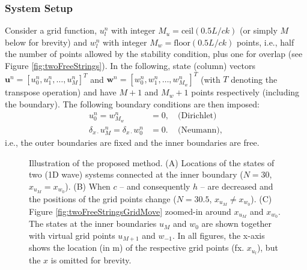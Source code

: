 \documentclass[dvipsnames, reprint]{JASA}
\begin{document}
\subsubsection{System Setup}\label{sec:systSetup}
Consider a grid function, $u_l^n$ with integer $M_u = \text{ceil}(0.5L/ck)$ (or simply $M$ below for brevity) and $w_l^n$ with integer $M_w = \text{floor}(0.5L/ck)$ points, i.e., half the number of points allowed by the stability condition, plus one for overlap (see Figure \ref{fig:twoFreeStrings}). In the following, state (column) vectors $\mathbf{u}^n = [u_0^n, u_1^n, \hdots, u_M^n]^T$ and $\mathbf{w}^n = [w_0^n, w_1^n, \hdots, w_{M_w}^n]^T$ (with $T$ denoting the transpose operation) and have $M + 1$ and $M_{w} + 1$ points respectively (including the boundary). The following boundary conditions are then imposed:
\begin{subequations}\label{eq:halfStringBoundaryCond}
    \begin{align}
        u_0^n = w_{M_w}^n &= 0,\quad \text{(Dirichlet)}\label{eq:halfStringBoundaryCondDirichlet}\\
        \delta_{x\cdot}u_M^n = \delta_{x\cdot}w_0^n &= 0.\, \quad\text{(Neumann)}, \label{eq:halfStringBoundaryCondNeumann}
    \end{align}
\end{subequations}
i.e., the outer boundaries are fixed and the inner boundaries are free.
%
\begin{figure}[ht]
\caption{Illustration of the proposed method. (A) Locations of the states of two (1D wave) systems connected at the inner boundary ($N = 30$, $x_{u_M} = x_{w_0}$). (B) When $c$ -- and consequently $h$ -- are decreased and the positions of the grid points change ($N = 30.5$, $x_{u_M} \neq x_{w_0}$). (C) Figure \ref{fig:twoFreeStringsGridMove} zoomed-in around $x_{u_M}$ and $x_{w_0}$. The states at the inner boundaries $u_M$ and $w_0$ are shown together with virtual grid points $u_{M+1}$ and $w_{-1}$. In all figures, the x-axis shows the location (in m) of the respective grid points (fx. $x_{u_l}$), but the $x$ is omitted for brevity.}
\end{figure}
\end{document}
